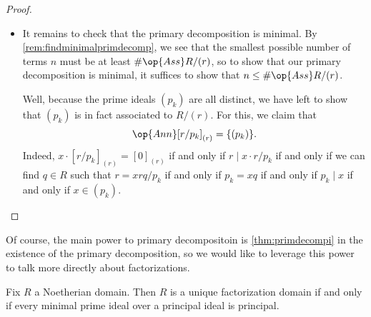 \begin{proof}
\begin{itemize}
		\item It remains to check that the primary decomposition is minimal. By \autoref{rem:findminimalprimdecomp}, we see that the smallest possible number of terms $n$ must be at least $\#\op{Ass}R/(r)$, so to show that our primary decomposition is minimal, it suffices to show that $n\le\#\op{Ass}R/(r)$.

		Well, because the prime ideals $(p_k)$ are all distinct, we have left to show that $(p_k)$ is in fact associated to $R/(r)$. For this, we claim that
		\[\op{Ann}[r/p_k]_{(r)}=\{(p_k)\}.\]
		Indeed, $x\cdot[r/p_k]_{(r)}=[0]_{(r)}$ if and only if $r\mid x\cdot r/p_k$ if and only if we can find $q\in R$ such that $r=xrq/p_k$ if and only if $p_k=xq$ if and only if $p_k\mid x$ if and only if $x\in(p_k)$.
		\qedhere
	\end{itemize}
\end{proof}
Of course, the main power to primary decompositoin is \autoref{thm:primdecompi} in the existence of the primary decomposition, so we would like to leverage this power to talk more directly about factorizations.
\begin{proposition} \label{prop:equivufd}
	Fix $R$ a Noetherian domain. Then $R$ is a unique factorization domain if and only if every minimal prime ideal over a principal ideal is principal.
\end{proposition}
